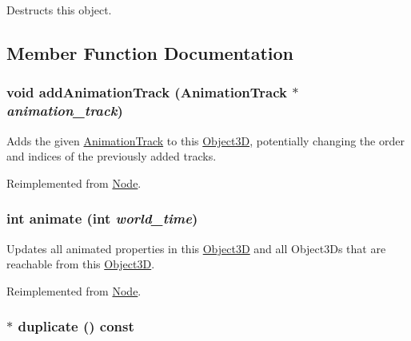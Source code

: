Destructs this object. 

\subsection{Member Function Documentation}
\hypertarget{classm3g_1_1Sprite3D_415c0b110f95410ded9b85e5d99a496b}{
\subsubsection[{addAnimationTrack}]{\setlength{\rightskip}{0pt plus 5cm}void addAnimationTrack ({\bf AnimationTrack} $\ast$ {\em animation\_\-track})}}
\label{classm3g_1_1Sprite3D_415c0b110f95410ded9b85e5d99a496b}


Adds the given \hyperlink{classm3g_1_1AnimationTrack}{AnimationTrack} to this \hyperlink{classm3g_1_1Object3D}{Object3D}, potentially changing the order and indices of the previously added tracks. 

Reimplemented from \hyperlink{classm3g_1_1Node_415c0b110f95410ded9b85e5d99a496b}{Node}.\hypertarget{classm3g_1_1Sprite3D_8aad1ceab4c2a03609c8a42324ce484d}{
\subsubsection[{animate}]{\setlength{\rightskip}{0pt plus 5cm}int animate (int {\em world\_\-time})}}
\label{classm3g_1_1Sprite3D_8aad1ceab4c2a03609c8a42324ce484d}


Updates all animated properties in this \hyperlink{classm3g_1_1Object3D}{Object3D} and all Object3Ds that are reachable from this \hyperlink{classm3g_1_1Object3D}{Object3D}. 

Reimplemented from \hyperlink{classm3g_1_1Node_8aad1ceab4c2a03609c8a42324ce484d}{Node}.\hypertarget{classm3g_1_1Sprite3D_0af34e87be803eb476f9e118d2363246}{
\subsubsection[{duplicate}]{ $\ast$ duplicate () const}}
\label{classm3g_1_1Sprite3D_0af34e87be803eb476f9e118d2363246}


